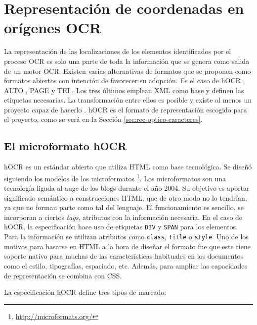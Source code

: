 
\section{Representación de coordenadas en orígenes OCR}

La representación de las localizaciones de los elementos identificados por el proceso OCR es solo una parte de toda la información que se genera como salida de un motor OCR. Existen varias alternativas de formatos que se proponen como formatos abiertos con intención de favorecer su adopción. Es el caso de hOCR \cite{ocrRepres_hocr_breuel_spec}, ALTO \cite{ocrRepres_alto_spec}, PAGE \cite{ocrRepres_page_pletschacher_paper} y TEI \cite{ocrRepres_tei_project}. Los tres últimos emplean XML como base y definen las etiquetas necesarias. La transformación entre ellos es posible y existe al menos un proyecto capaz de hacerlo
\cite{ocrRepres_conversion_ocrFileformat}. hOCR es el formato de representación escogido para el proyecto, como se verá en la Sección \ref{sec:rec-optico-caracteres}.

\subsection{El microformato hOCR}

hOCR es un estándar abierto que utiliza HTML como base tecnológica. Se diseñó siguiendo los modelos de los microformatos \footnote{\url{http://microformats.org/}}. Los microformatos son una tecnología ligada al auge de los blogs durante el año 2004. Su objetivo es aportar significado semántico a construcciones HTML, que de otro modo no lo tendrían, ya que no forman parte como tal del lenguaje. El funcionamiento es sencillo, se incorporan a ciertos \emph{tags}, atributos con la información necesaria. En el caso de hOCR, la especificación hace uso de etiquetas \verb|DIV| y \verb|SPAN| para los elementos. Para la información se utilizan atributos como \verb|class|, \verb|title| o \verb|style|. Uno de los motivos para basarse en HTML a la hora de diseñar el formato fue que este tiene soporte nativo para muchas de las características habituales en los documentos como el estilo, tipografías, espaciado, etc. Además, para ampliar las capacidades de representación se combina con CSS.

La especificación hOCR define tres tipos de marcado:

